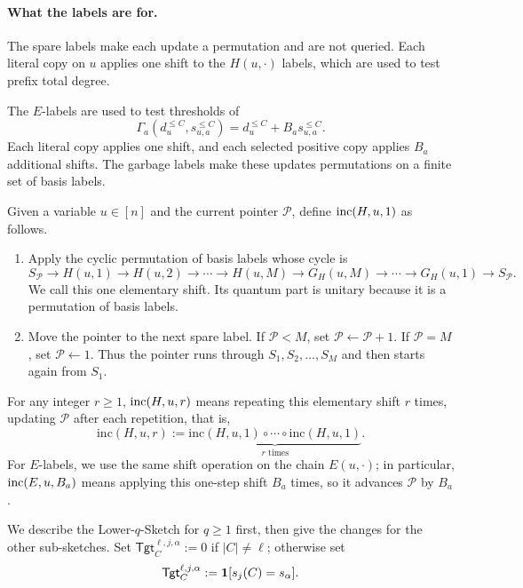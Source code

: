 \paragraph{What the labels are for.}
The spare labels make each update a permutation and are not queried. Each literal copy on $u$ applies one shift to the $H(u,\cdot)$ labels, which are used to test prefix total degree.

The $E$-labels are used to test thresholds of
\[
\Gamma_a(d_u^{\le C},s_{u,a}^{\le C})
=d_u^{\le C}+B_a s_{u,a}^{\le C}.
\]
Each literal copy applies one shift, and each selected positive copy applies $B_a$ additional shifts. The garbage labels make these updates permutations on a finite set of basis labels.

\begin{definition}
Given a variable $u\in[n]$ and the current  pointer $\mathcal P$, define $\mathrm{inc}(H,u,1)$ as follows.
\begin{enumerate}
    \item Apply the cyclic permutation of basis labels whose cycle is
    \[
    S_{\mathcal P}\to H(u,1)\to H(u,2)\to \cdots \to H(u,M)
    \to G_H(u,M)\to \cdots \to G_H(u,1)\to S_{\mathcal P}.
    \]
    We call this one elementary shift. Its quantum part is unitary because it is
    a permutation of basis labels.
    \item Move the pointer to the next spare label. If $\mathcal P<M$,
set $\mathcal P\leftarrow \mathcal P+1$. If $\mathcal P=M$, set
$\mathcal P\leftarrow 1$. Thus the pointer runs through
$S_1,S_2,\ldots,S_M$ and then starts again from $S_1$.
\end{enumerate}
For any integer $r\ge1$, $\mathrm{inc}(H,u,r)$ means repeating this elementary shift $r$ times, updating $\mathcal P$ after each repetition, that is, \[
  \mathrm{inc}(H,u,r):=\underbrace{\mathrm{inc}(H,u,1)\circ\cdots\circ\mathrm{inc}(H,u,1)}_{r\text{ times}}.
\]
For $E$-labels, we use the same shift operation on the chain $E(u,\cdot)$; in particular, $\mathrm{inc}(E,u,B_a)$ means applying this one-step shift $B_a$ times, so it advances $\mathcal P$ by $B_a$.
\end{definition}

We describe the Lower-$q$-Sketch for $q\ge1$ first, then give the changes for the other sub-sketches. Set $\mathsf{Tgt}^{\ell,j,\alpha}_{C}:=0$ if $|C|\ne\ell$; otherwise set
\[
\mathsf{Tgt}^{\ell,j,\alpha}_{C}:=\mathbf 1[s_j(C)=s_\alpha].
\]




